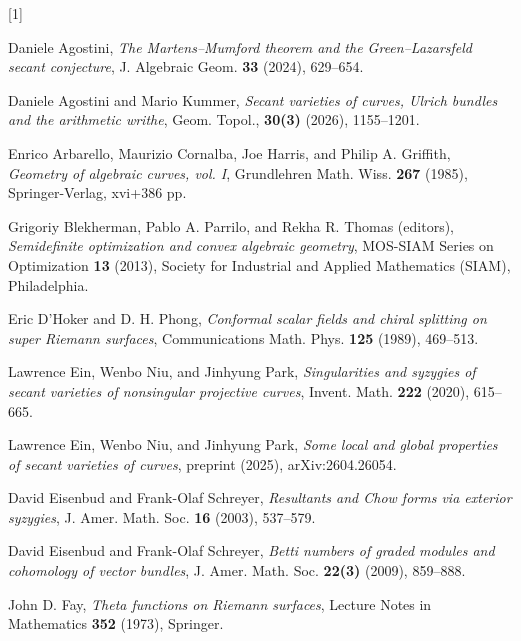 \documentclass[12pt]{amsart}
\newcounter{conj}
\numberwithin{equation}{section}
\numberwithin{thmcounter}{section}
\theoremstyle{definition}
\theoremstyle{claim}
\begin{document}

\begin{thebibliography}{[1]}

    Daniele Agostini, \textit{The Martens--Mumford theorem and the Green--Lazarsfeld secant conjecture}, J. Algebraic Geom. \textbf{33} (2024), 629--654.

    Daniele Agostini and Mario Kummer, \textit{Secant varieties of curves, Ulrich bundles and the arithmetic writhe}, Geom. Topol.,  \textbf{30(3)} (2026), 1155--1201.

    Enrico Arbarello, Maurizio Cornalba, Joe Harris, and Philip A. Griffith, \textit{Geometry of algebraic curves, vol. I}, Grundlehren Math. Wiss. \textbf{267} (1985), Springer-Verlag, xvi+386 pp.

    Grigoriy Blekherman, Pablo A. Parrilo, and Rekha R. Thomas (editors), \textit{Semidefinite optimization and convex algebraic geometry}, MOS-SIAM Series on Optimization \textbf{13} (2013), Society for Industrial and Applied Mathematics (SIAM), Philadelphia.

    Eric D’Hoker and D. H. Phong, \textit{Conformal scalar fields and chiral splitting on super Riemann surfaces},
    Communications Math. Phys. \textbf{125} (1989), 469--513.


    Lawrence Ein, Wenbo Niu, and Jinhyung Park, \textit{Singularities and syzygies of secant varieties of nonsingular projective curves}, Invent. Math. \textbf{222} (2020), 615--665.

    Lawrence Ein, Wenbo Niu, and Jinhyung Park, \textit{Some local and global properties of secant varieties of curves}, preprint (2025), arXiv:2604.26054.

    David Eisenbud and Frank-Olaf Schreyer, \textit{Resultants and Chow forms via exterior syzygies}, J. Amer. Math. Soc. \textbf{16} (2003), 537--579.

    David Eisenbud and Frank-Olaf Schreyer,
    \textit{Betti numbers of graded modules and cohomology of vector bundles}, J. Amer. Math. Soc.  \textbf{22(3)} (2009), 859--888.

   John D. Fay, \textit{Theta functions on Riemann surfaces}, Lecture Notes in Mathematics \textbf{352} (1973), Springer.


\end{thebibliography}
\end{document}
